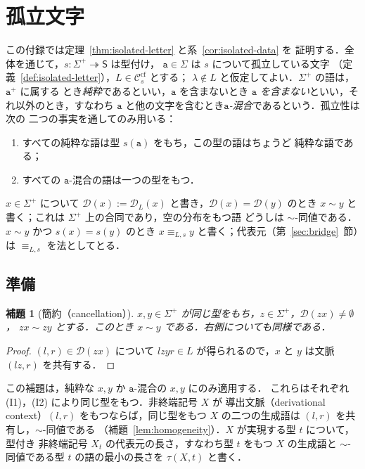 \documentclass[11pt,a4paper]{ltjsarticle}
\numberwithin{equation}{section}
\theoremstyle{plain}
\newtheorem{lemma}[theorem]{補題}
\theoremstyle{definition}
\theoremstyle{remark}
\theoremstyle{plain}
\newcommand{\cf}{\mathrm{cf}}
\newcommand{\Ccf}[1]{\mathcal C_{#1}^{\cf}}
\newcommand{\D}{\mathcal{D}}
\newcommand{\eps}{\lambda}
\begin{document}
\section{孤立文字}
\label{app:isolated}

この付録では定理~\ref{thm:isolated-letter} と系~\ref{cor:isolated-data} を
証明する．全体を通じて，$s:\Sigma^+\twoheadrightarrow\mathsf S$ は型付け，
$\mathtt a\in\Sigma$ は $s$ について孤立している文字
（定義~\ref{def:isolated-letter}），$L\in\Ccf{s}$ とする；
$\eps\notin L$ と仮定してよい．$\Sigma^+$ の語は，$\mathtt a^+$ に属する
とき\emph{純粋}であるといい，$\mathtt a$ を含まないとき
\emph{$\mathtt a$ を含まない}といい，それ以外のとき，すなわち $\mathtt a$
と他の文字を含むとき\emph{$\mathtt a$-混合}であるという．孤立性は次の
二つの事実を通してのみ用いる：
\begin{enumerate}[label=\textup{(I\arabic*)},leftmargin=*]
\item すべての純粋な語は型 $s(\mathtt a)$ をもち，この型の語はちょうど
純粋な語である；
\item すべての $\mathtt a$-混合の語は一つの型をもつ．
\end{enumerate}
$x\in\Sigma^+$ について $\D(x):=\D_L(x)$ と書き，$\D(x)=\D(y)$ のとき
$x\sim y$ と書く；これは $\Sigma^+$ 上の合同であり，空の分布をもつ語
どうしは $\sim$-同値である．$x\sim y$ かつ $s(x)=s(y)$ のとき
$x\equiv_{L,s}y$ と書く；代表元（第~\ref{sec:bridge}~節）は
$\equiv_{L,s}$ を法としてとる．

\subsection{準備}

\begin{lemma}[簡約（cancellation）]
\label{lem:app-h-cancel}
$x,y\in\Sigma^+$ が同じ型をもち，$z\in\Sigma^+$，$\D(zx)\ne\emptyset$，
$zx\sim zy$ とする．このとき $x\sim y$ である．右側についても同様である．
\end{lemma}

\begin{proof}
$(l,r)\in\D(zx)$ について $lzyr\in L$ が得られるので，$x$ と $y$ は文脈
$(lz,r)$ を共有する．
\end{proof}

この補題は，純粋な $x,y$ か $\mathtt a$-混合の $x,y$ にのみ適用する．
これらはそれぞれ (I1)，(I2) により同じ型をもつ．非終端記号 $X$ が
導出文脈（derivational context）$(l,r)$ をもつならば，同じ型をもつ $X$
の二つの生成語は $(l,r)$ を共有し，$\sim$-同値である
（補題~\ref{lem:homogeneity}）．$X$ が実現する型 $t$ について，型付き
非終端記号 $X_t$ の代表元の長さ，すなわち型 $t$ をもつ $X$ の生成語と
$\sim$-同値である型 $t$ の語の最小の長さを $\tau(X,t)$ と書く．
\end{document}
